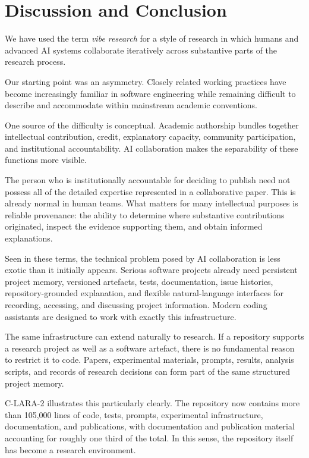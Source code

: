 \section{Discussion and Conclusion}

We have used the term \emph{vibe research} for a style of research in which humans and advanced AI systems collaborate iteratively across substantive parts of the research process.

Our starting point was an asymmetry. Closely related working practices have become increasingly familiar in software engineering while remaining difficult to describe and accommodate within mainstream academic conventions.

One source of the difficulty is conceptual. Academic authorship bundles together intellectual contribution, credit, explanatory capacity, community participation, and institutional accountability. AI collaboration makes the separability of these functions more visible.

The person who is institutionally accountable for deciding to publish need not possess all of the detailed expertise represented in a collaborative paper. This is already normal in human teams. What matters for many intellectual purposes is reliable provenance: the ability to determine where substantive contributions originated, inspect the evidence supporting them, and obtain informed explanations.

Seen in these terms, the technical problem posed by AI collaboration is less exotic than it initially appears. Serious software projects already need persistent project memory, versioned artefacts, tests, documentation, issue histories, repository-grounded explanation, and flexible natural-language interfaces for recording, accessing, and discussing project information. Modern coding assistants are designed to work with exactly this infrastructure.

The same infrastructure can extend naturally to research. If a repository supports a research project as well as a software artefact, there is no fundamental reason to restrict it to code. Papers, experimental materials, prompts, results, analysis scripts, and records of research decisions can form part of the same structured project memory.

C-LARA-2 illustrates this particularly clearly. The repository now contains more than 105,000 lines of code, tests, prompts, experimental infrastructure, documentation, and publications, with documentation and publication material accounting for roughly one third of the total. In this sense, the repository itself has become a research environment.

